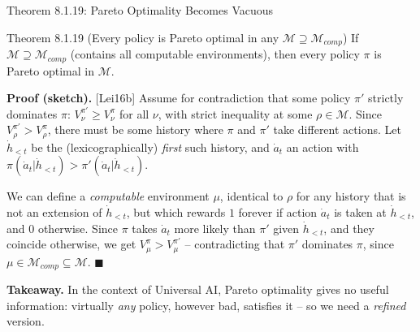 \documentclass[aspectratio=169,10pt]{beamer}
\newcommand{\Mcomp}{\mathcal{M}_{comp}}
\begin{document}
\begin{frame}[allowframebreaks]{Theorem 8.1.19: Pareto Optimality Becomes Vacuous}
  \begin{block}{Theorem 8.1.19 (Every policy is Pareto optimal in any $\mathcal{M}\supseteq\Mcomp$)}
    If $\mathcal{M}\supseteq\Mcomp$ (contains all computable
    environments), then every policy $\pi$ is Pareto optimal in $\mathcal{M}$.
  \end{block}

  \textbf{Proof (sketch).} [Lei16b] Assume for contradiction that some
  policy $\pi'$ strictly dominates $\pi$: $V_\nu^{\pi'}\ge V_\nu^\pi$ for
  all $\nu$, with strict inequality at some $\rho\in\mathcal{M}$. Since
  $V_\rho^{\pi'}>V_\rho^\pi$, there must be some history where $\pi$ and
  $\pi'$ take different actions. Let $\dot h_{<t}$ be the
  (lexicographically) \emph{first} such history, and $\dot a_t$ an action
  with $\pi(\dot a_t|\dot h_{<t}) > \pi'(\dot a_t|\dot h_{<t})$.

  \bigskip
  We can define a \emph{computable} environment $\mu$, identical to $\rho$
  for any history that is not an extension of $\dot h_{<t}$, but which
  rewards $1$ forever if action $\dot a_t$ is taken at $\dot h_{<t}$, and
  $0$ otherwise. Since $\pi$ takes $\dot a_t$ more likely than $\pi'$ given
  $\dot h_{<t}$, and they coincide otherwise, we get $V_\mu^\pi >
  V_\mu^{\pi'}$ -- contradicting that $\pi'$ dominates $\pi$, since
  $\mu\in\Mcomp\subseteq\mathcal{M}$. $\blacksquare$

  \bigskip
  \textbf{Takeaway.} In the context of Universal AI, Pareto optimality
  gives no useful information: virtually \emph{any} policy, however bad,
  satisfies it -- so we need a \emph{refined} version.
\end{frame}
\end{document}
